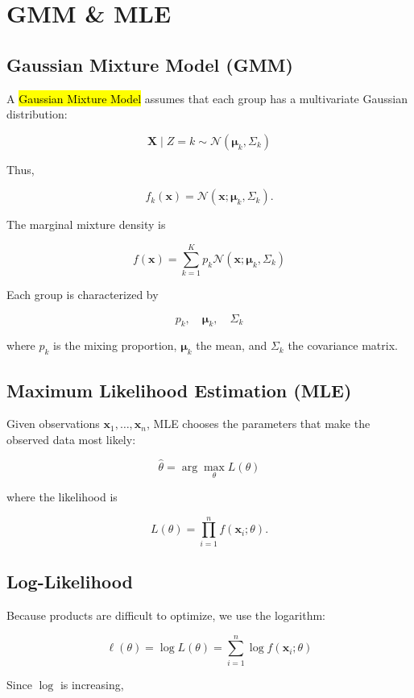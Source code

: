 \section{GMM \& MLE}

\subsection{Gaussian Mixture Model (GMM)}

A \hl{Gaussian Mixture Model} assumes that each group has a multivariate
Gaussian distribution:

$$
\boxed{
\mathbf{X}\mid Z=k
\sim
\mathcal{N}(\boldsymbol{\mu}_k,\Sigma_k)
}
$$

Thus,

$$
f_k(\mathbf{x})
=
\mathcal{N}(\mathbf{x};
\boldsymbol{\mu}_k,\Sigma_k).
$$

The marginal mixture density is

$$
\boxed{
f(\mathbf{x})
=
\sum_{k=1}^K
p_k\mathcal{N}(\mathbf{x};
\boldsymbol{\mu}_k,\Sigma_k)
}
$$

Each group is characterized by

$$
\boxed{
p_k,\quad\boldsymbol{\mu}_k,\quad\Sigma_k
}
$$

where $p_k$ is the mixing proportion, $\boldsymbol{\mu}_k$ the mean, and
$\Sigma_k$ the covariance matrix.

\subsection{Maximum Likelihood Estimation (MLE)}

Given observations $\mathbf{x}_1,\ldots,\mathbf{x}_n$, MLE chooses the
parameters that make the observed data most likely:

$$
\boxed{
\hat{\theta}
=
\arg\max_\theta L(\theta)
}
$$

where the likelihood is

$$
L(\theta)
=
\prod_{i=1}^n f(\mathbf{x}_i;\theta).
$$

\subsection{Log-Likelihood}

Because products are difficult to optimize, we use the logarithm:

$$
\boxed{
\ell(\theta)
=
\log L(\theta)
=
\sum_{i=1}^n
\log f(\mathbf{x}_i;\theta)
}
$$

Since $\log$ is increasing,

